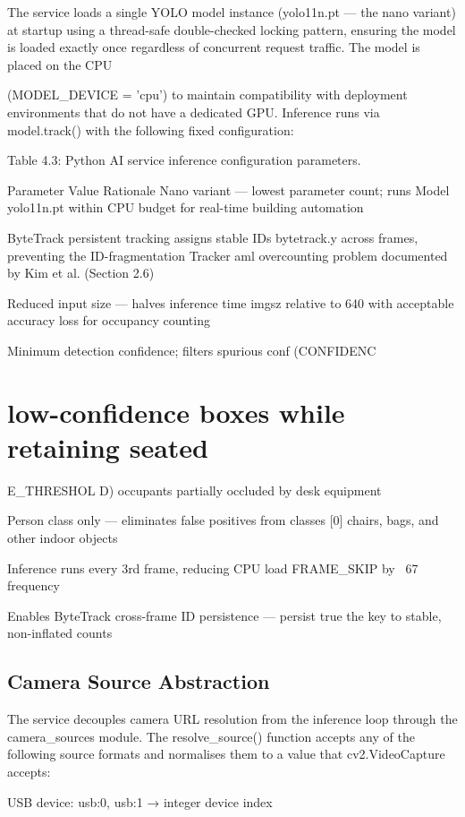 The service loads a single YOLO model instance (yolo11n.pt --- the nano variant) at
startup using a thread-safe double-checked locking pattern, ensuring the model is loaded
exactly once regardless of concurrent request traffic. The model is placed on the CPU

(MODEL_DEVICE = 'cpu') to maintain compatibility with deployment environments that
do not have a dedicated GPU. Inference runs via model.track() with the following fixed
configuration:

Table 4.3: Python AI service inference configuration parameters.

Parameter Value Rationale
Nano variant --- lowest parameter count; runs
Model yolo11n.pt within CPU budget for real-time building
automation

ByteTrack persistent tracking assigns stable IDs
bytetrack.y across frames, preventing the ID-fragmentation
Tracker
aml overcounting problem documented by Kim et al.
(Section 2.6)

Reduced input size --- halves inference time
imgsz relative to 640 with acceptable accuracy loss for
occupancy counting

Minimum detection confidence; filters spurious
conf (CONFIDENC
\section{low-confidence boxes while retaining seated}

E_THRESHOL D)
occupants partially occluded by desk equipment

Person class only --- eliminates false positives from
classes [0]
chairs, bags, and other indoor objects

Inference runs every 3rd frame, reducing CPU load
FRAME_SKIP by ~67%
frequency

Enables ByteTrack cross-frame ID persistence ---
persist true
the key to stable, non-inflated counts


\subsection{Camera Source Abstraction}


The service decouples camera URL resolution from the inference loop through the
camera_sources module. The resolve_source() function accepts any of the following
source formats and normalises them to a value that cv2.VideoCapture accepts:


 USB device: usb:0, usb:1 → integer device index

